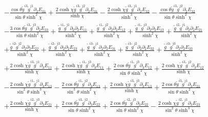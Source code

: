 \documentclass[10pt,letterpaper]{article}
\numberwithin{equation}{section}
\begin{document}
\begin{appendices}
\begin{eqnarray}
&& -  \frac{\cos\theta \tilde{g}^{i3} \tilde{g}^{j1} \partial_{2}E_{31}}{\sin\theta \sinh^2\chi} + \frac{2 \cosh\chi \tilde{g}^{i3} \tilde{g}^{j2} \partial_{2}E_{31}}{\sinh\chi} -  \frac{2 \cosh\chi \tilde{g}^{i3} \tilde{g}^{j1} \partial_{2}E_{32}}{\sinh^3\chi} -  \frac{\cos\theta \tilde{g}^{i3} \tilde{g}^{j2} \partial_{2}E_{32}}{\sin\theta \sinh^2\chi} \nonumber \\ 
&& -  \frac{3 \cos\theta \tilde{g}^{i3} \tilde{g}^{j3} \partial_{2}E_{33}}{\sin\theta \sinh^2\chi} + \frac{\tilde{g}^{i1} \tilde{g}^{j1} \partial_{2}\partial_{2}E_{11}}{\sinh^2\chi} + \frac{\tilde{g}^{i1} \tilde{g}^{j2} \partial_{2}\partial_{2}E_{12}}{\sinh^2\chi} + \frac{\tilde{g}^{i1} \tilde{g}^{j3} \partial_{2}\partial_{2}E_{13}}{\sinh^2\chi} + \frac{\tilde{g}^{i2} \tilde{g}^{j1} \partial_{2}\partial_{2}E_{21}}{\sinh^2\chi} \nonumber \\ 
&& + \frac{\tilde{g}^{i2} \tilde{g}^{j2} \partial_{2}\partial_{2}E_{22}}{\sinh^2\chi} + \frac{\tilde{g}^{i2} \tilde{g}^{j3} \partial_{2}\partial_{2}E_{23}}{\sinh^2\chi} + \frac{\tilde{g}^{i3} \tilde{g}^{j1} \partial_{2}\partial_{2}E_{31}}{\sinh^2\chi} + \frac{\tilde{g}^{i3} \tilde{g}^{j2} \partial_{2}\partial_{2}E_{32}}{\sinh^2\chi} + \frac{\tilde{g}^{i3} \tilde{g}^{j3} \partial_{2}\partial_{2}E_{33}}{\sinh^2\chi} \nonumber \\ 
&& + \frac{2 \cosh\chi \tilde{g}^{i3} \tilde{g}^{j1} \partial_{3}E_{11}}{\sinh\chi} + \frac{2 \cosh\chi \tilde{g}^{i1} \tilde{g}^{j3} \partial_{3}E_{11}}{\sinh\chi} + \frac{2 \cos\theta \tilde{g}^{i1} \tilde{g}^{j3} \partial_{3}E_{12}}{\sin\theta \sinh^2\chi} + \frac{2 \cosh\chi \tilde{g}^{i3} \tilde{g}^{j2} \partial_{3}E_{12}}{\sinh\chi} \nonumber \\ 
&& -  \frac{2 \cosh\chi \tilde{g}^{i1} \tilde{g}^{j1} \partial_{3}E_{13}}{\sin^2\theta \sinh^3\chi} -  \frac{2 \cos\theta \tilde{g}^{i1} \tilde{g}^{j2} \partial_{3}E_{13}}{\sin^3\theta \sinh^2\chi} + \frac{2 \cosh\chi \tilde{g}^{i3} \tilde{g}^{j3} \partial_{3}E_{13}}{\sinh\chi} + \frac{2 \cos\theta \tilde{g}^{i3} \tilde{g}^{j1} \partial_{3}E_{21}}{\sin\theta \sinh^2\chi} \nonumber \\ 
&& + \frac{2 \cosh\chi \tilde{g}^{i2} \tilde{g}^{j3} \partial_{3}E_{21}}{\sinh\chi} + \frac{2 \cos\theta \tilde{g}^{i3} \tilde{g}^{j2} \partial_{3}E_{22}}{\sin\theta \sinh^2\chi} + \frac{2 \cos\theta \tilde{g}^{i2} \tilde{g}^{j3} \partial_{3}E_{22}}{\sin\theta \sinh^2\chi} -  \frac{2 \cosh\chi \tilde{g}^{i2} \tilde{g}^{j1} \partial_{3}E_{23}}{\sin^2\theta \sinh^3\chi} \nonumber \\ 

\end{eqnarray}
\end{appendices}
\end{document}
